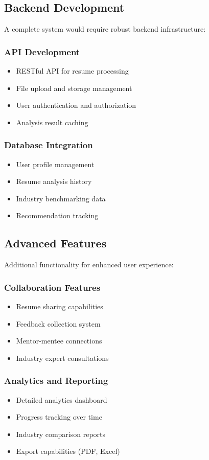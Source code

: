\documentclass[12pt,a4paper]{article}
\begin{document}
\subsection{Backend Development}
A complete system would require robust backend infrastructure:

\subsubsection{API Development}
\begin{itemize}
    \item RESTful API for resume processing
    \item File upload and storage management
    \item User authentication and authorization
    \item Analysis result caching
\end{itemize}

\subsubsection{Database Integration}
\begin{itemize}
    \item User profile management
    \item Resume analysis history
    \item Industry benchmarking data
    \item Recommendation tracking
\end{itemize}

\subsection{Advanced Features}
Additional functionality for enhanced user experience:

\subsubsection{Collaboration Features}
\begin{itemize}
    \item Resume sharing capabilities
    \item Feedback collection system
    \item Mentor-mentee connections
    \item Industry expert consultations
\end{itemize}

\subsubsection{Analytics and Reporting}
\begin{itemize}
    \item Detailed analytics dashboard
    \item Progress tracking over time
    \item Industry comparison reports
    \item Export capabilities (PDF, Excel)
\end{itemize}
\end{document}
